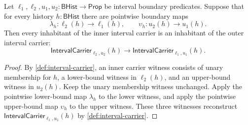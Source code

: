 \begin{closurestatus}{\IntervalUp}
  \theoryclosure{\matureClosure}
  \formalstatus{\axiomCleanV}
\end{closurestatus}

\begin{theorem}
\label{thm:interval-carrier-boundary-weakening}
Let \(\ell_1,\ell_2,u_1,u_2:\mathsf{BHist}\to\mathsf{Prop}\) be interval boundary predicates. Suppose that for every history \(h:\mathsf{BHist}\) there are pointwise boundary maps
$$
\lambda_h:\ell_2(h)\to\ell_1(h),
\qquad
\upsilon_h:u_2(h)\to u_1(h).
$$
Then every inhabitant of the inner interval carrier is an inhabitant of the outer interval carrier:
$$
\mathsf{IntervalCarrier}_{\ell_2,u_2}(h)\to
\mathsf{IntervalCarrier}_{\ell_1,u_1}(h).
$$
\end{theorem}
\begin{proof}
By \autoref{def:interval-carrier}, an inner carrier witness consists of unary membership for \(h\), a lower-bound witness in \(\ell_2(h)\), and an upper-bound witness in \(u_2(h)\). Keep the unary membership witness unchanged. Apply the pointwise lower-bound map \(\lambda_h\) to the lower witness, and apply the pointwise upper-bound map \(\upsilon_h\) to the upper witness. These three witnesses reconstruct \(\mathsf{IntervalCarrier}_{\ell_1,u_1}(h)\) by \autoref{def:interval-carrier}.
\end{proof}

